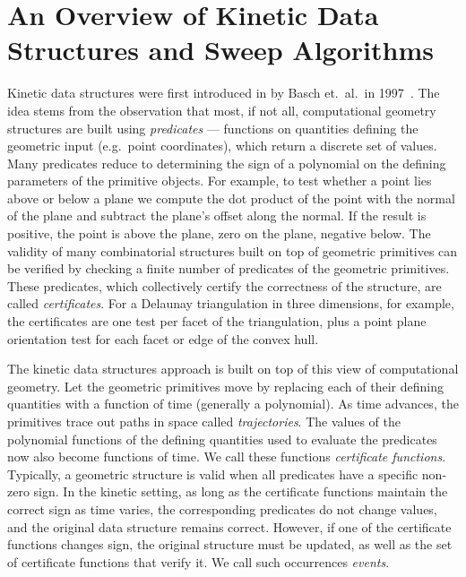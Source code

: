 \section{An Overview of Kinetic Data Structures and Sweep Algorithms\label{sec:kds_intro}}



Kinetic data structures were first introduced in by Basch et.\ al.\ in
1997~\cite{cgal:bgh-dsmd-97}.  The idea stems from the observation that
most, if not all, computational geometry structures are built using
{\em predicates} --- functions on quantities defining the geometric
input (e.g.\ point coordinates), which return a discrete set of
values. Many predicates reduce to determining the sign of a polynomial
on the defining parameters of the primitive objects. For example, to
test whether a point lies above or below a plane we compute the dot
product of the point with the normal of the plane and subtract the
plane's offset along the normal. If the result is positive, the point
is above the plane, zero on the plane, negative below. The validity of
many combinatorial structures built on top of geometric primitives can
be verified by checking a finite number of predicates of the geometric
primitives.  These predicates, which collectively certify the
correctness of the structure, are called {\em certificates}.  For a
Delaunay triangulation in three dimensions, for example, the
certificates are one  test per facet of the
triangulation, plus a point plane orientation test for each facet or
edge of the convex hull.

The kinetic data structures approach is built on top of this view of
computational geometry. Let the geometric primitives move by replacing
each of their defining quantities with a function of time (generally a
polynomial). As time advances, the primitives trace out paths in
space called {\em trajectories}. The values of the polynomial
functions of the defining quantities used to evaluate the predicates now
also become functions of time. We call these functions
{\em certificate functions}. Typically, a geometric structure is valid when
all predicates have a specific non-zero sign. In the kinetic setting,
as long as the certificate functions maintain the correct sign as time varies,
the corresponding predicates do not change values,
and the original data structure remains correct. However, if
one of the certificate functions changes sign, the original structure
must be updated, as well as the set of certificate functions that
verify it.  We call such occurrences {\em events}.


